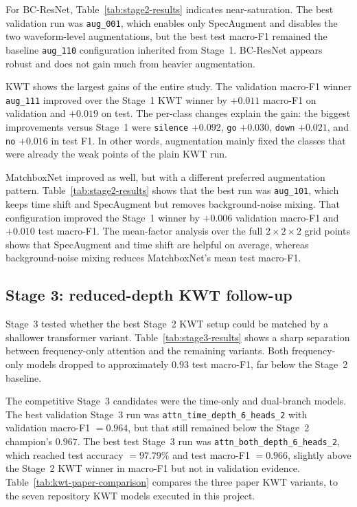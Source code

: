 \documentclass[11pt]{article}
\begin{document}
For BC-ResNet, Table~\ref{tab:stage2-results} indicates near-saturation. The best validation run was \texttt{aug\_001}, which enables only SpecAugment and disables the two waveform-level augmentations, but the best test macro-F1 remained the baseline \texttt{aug\_110} configuration inherited from Stage~1. BC-ResNet appears robust and does not gain much from heavier augmentation.

KWT shows the largest gains of the entire study. The validation macro-F1 winner \texttt{aug\_111} improved over the Stage~1 KWT winner by \(+0.011\) macro-F1 on validation and \(+0.019\) on test. The per-class changes explain the gain: the biggest improvements versus Stage~1 were \texttt{silence} \(+0.092\), \texttt{go} \(+0.030\), \texttt{down} \(+0.021\), and \texttt{no} \(+0.016\) in test F1. In other words, augmentation mainly fixed the classes that were already the weak points of the plain KWT run.

MatchboxNet improved as well, but with a different preferred augmentation pattern. Table~\ref{tab:stage2-results} shows that the best run was \texttt{aug\_101}, which keeps time shift and SpecAugment but removes background-noise mixing. That configuration improved the Stage~1 winner by \(+0.006\) validation macro-F1 and \(+0.010\) test macro-F1. The mean-factor analysis over the full \(2\times2\times2\) grid points shows that SpecAugment and time shift are helpful on average, whereas background-noise mixing reduces MatchboxNet's mean test macro-F1.

\subsection*{Stage 3: reduced-depth KWT follow-up}
Stage~3 tested whether the best Stage~2 KWT setup could be matched by a shallower transformer variant. Table~\ref{tab:stage3-results} shows a sharp separation between frequency-only attention and the remaining variants. Both frequency-only models dropped to approximately \(0.93\) test macro-F1, far below the Stage~2 baseline.

The competitive Stage~3 candidates were the time-only and dual-branch models. The best validation Stage~3 run was \texttt{attn\_time\_depth\_6\_heads\_2} with validation macro-F1 \(=0.964\), but that still remained below the Stage~2 champion's \(0.967\). The best test Stage~3 run was \texttt{attn\_both\_depth\_6\_heads\_2}, which reached test accuracy \(=97.79\%\) and test macro-F1 \(=0.966\), slightly above the Stage~2 KWT winner in macro-F1 but not in validation evidence. Table~\ref{tab:kwt-paper-comparison} compares the three paper KWT variants, to the seven repository KWT models executed in this project. 
\end{document}
